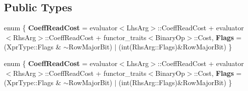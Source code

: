 \subsection*{Public Types}
\begin{DoxyCompactItemize}
\item 
\mbox{\label{struct_eigen_1_1internal_1_1sparse__conjunction__evaluator_3_01_xpr_type_00_01_index_based_00_01_iterator_based_01_4_a89f89dba18af2fa51464969950935eea}} 
enum \{ {\bfseries Coeff\+Read\+Cost} = evaluator$<$Lhs\+Arg$>$\+:\+:Coeff\+Read\+Cost + evaluator$<$Rhs\+Arg$>$\+:\+:Coeff\+Read\+Cost + functor\+\_\+traits$<$Binary\+Op$>$\+:\+:Cost, 
{\bfseries Flags} = (Xpr\+Type\+:\+:Flags \& $\sim$\+Row\+Major\+Bit) $\vert$ (int(Rhs\+Arg\+:\+:Flags)\&Row\+Major\+Bit)
 \}
\item 
\mbox{\label{struct_eigen_1_1internal_1_1sparse__conjunction__evaluator_3_01_xpr_type_00_01_index_based_00_01_iterator_based_01_4_a8f1cb3ee05e477dcd8c71d6d3d18e4d2}} 
enum \{ {\bfseries Coeff\+Read\+Cost} = evaluator$<$Lhs\+Arg$>$\+:\+:Coeff\+Read\+Cost + evaluator$<$Rhs\+Arg$>$\+:\+:Coeff\+Read\+Cost + functor\+\_\+traits$<$Binary\+Op$>$\+:\+:Cost, 
{\bfseries Flags} = (Xpr\+Type\+:\+:Flags \& $\sim$\+Row\+Major\+Bit) $\vert$ (int(Rhs\+Arg\+:\+:Flags)\&Row\+Major\+Bit)
 \}
\end{DoxyCompactItemize}
